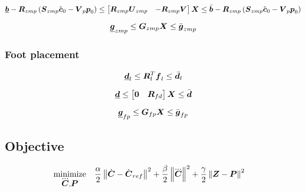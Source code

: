 \begin{equation*}
    \underline{\mbox{\boldmath $b$}} 
    -
    \mbox{\boldmath $R$}_{zmp}
    \left(
        \mbox{\boldmath $S$}_{zmp} \hat{\mbox{\boldmath $c$}}_0 - \mbox{\boldmath $V$}_p \mbox{\boldmath $p$}_0
    \right)
    \le 
    \begin{bmatrix}
        \mbox{\boldmath $R$}_{zmp} \mbox{\boldmath $U$}_{zmp} & - \mbox{\boldmath $R$}_{zmp} \mbox{\boldmath $V$} \\
    \end{bmatrix}
    \mbox{\boldmath $X$}
    \le
    \bar{\mbox{\boldmath $b$}}
    -
    \mbox{\boldmath $R$}_{zmp}
    \left(
        \mbox{\boldmath $S$}_{zmp} \hat{\mbox{\boldmath $c$}}_0 - \mbox{\boldmath $V$}_p \mbox{\boldmath $p$}_0
    \right)
\end{equation*}

\begin{equation*}
    \underline{\mbox{\boldmath $g$}}_{zmp}  \le  \mbox{\boldmath $G$}_{zmp} \mbox{\boldmath $X$}  \le  \bar{\mbox{\boldmath $g$}}_{zmp}
\end{equation*}

\subsubsection{Foot placement}
\begin{equation*}
\underline{\mbox{\boldmath $d$}}_l \le \mbox{\boldmath $R$}_l^T \mbox{\boldmath $f$}_l \le \bar{\mbox{\boldmath $d$}_l}
\end{equation*}

\begin{equation*}
\underline{\mbox{\boldmath $d$}} \le \begin{bmatrix} \mbox{\boldmath $0$} & \mbox{\boldmath $R$}_{fd} \end{bmatrix} \mbox{\boldmath $X$} \le \bar{\mbox{\boldmath $d$}}
\end{equation*}

\begin{equation*}
\underline{\mbox{\boldmath $g$}}_{fp}  \le  \mbox{\boldmath $G$}_{fp} \mbox{\boldmath $X$}  \le  \bar{\mbox{\boldmath $g$}}_{fp}
\end{equation*}



\subsection{Objective}
\begin{equation*}
\begin{split}
    \minimize{\cJerk, \FP}  & \frac{\alpha}{2} \norm{\cVel - \cVel_{ref}}^2 + 
                              \frac{\beta}{2}  \norm{\cJerk}^2 + 
                              \frac{\gamma}{2} \norm{\ZMP - \FP}^2
\end{split}
\end{equation*}

